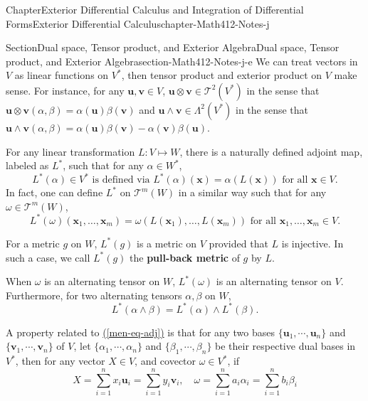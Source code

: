 \documentclass[oneside,10pt,]{book}
\newcommand{\xreffont}{\relax}
\newcommand{\terminology}[1]{\textbf{#1}}
\numberwithin{equation}{section}
\newcommand{\bu}{\mathbf{u}}
\newcommand{\bv}{\mathbf{v}}
\begin{document}
\begin{chapterptx}{Chapter}{Exterior Differential Calculus and Integration of Differential Forms}{}{Exterior Differential Calculus}{}{}{chapter-Math412-Notes-j}
\begin{sectionptx}{Section}{Dual space, Tensor product, and Exterior Algebra}{}{Dual space, Tensor product, and Exterior Algebra}{}{}{section-Math412-Notes-j-e}
We can treat vectors in \(V\) as linear functions on \(V^{*}\), then tensor product and exterior product  on \(V\) make sense. For instance, for any \(\bu, \bv \in V\), \(\bu\otimes \bv \in {\mathcal T}^{2}(V^{*})\) in the sense that \(\bu\otimes \bv (\alpha, \beta)= \alpha (\bu) \beta (\bv)\) and \(\bu\wedge\bv \in {\Lambda}^{2}(V^{*})\) in the sense that \(\bu\wedge \bv (\alpha, \beta)= \alpha (\bu) \beta (\bv)-\alpha(\bv)\beta (\bu)\).%
\par
For any linear transformation \(L:V\mapsto W\), there is a naturally defined adjoint map, labeled as \(L^{*}\), such that for any \(\alpha \in W^{*}\),%
\begin{equation}
L^{*}(\alpha)\in V^{*} \text{ is defined via }  L^{*}(\alpha)({\mathbf x})=\alpha(L({\mathbf x})) \text{ for all }
{\mathbf x} \in V.\label{men-eq-adj}
\end{equation}
In fact, one can define \(L^{*}\) on \({\mathcal T}^{m}(W)\) in a similar way such that for any \(\omega\in {\mathcal T}^{m}(W)\),%
\begin{equation*}
L^{*}(\omega)({\mathbf x}_{1}, \ldots, {\mathbf x}_{m})
=\omega(L({\mathbf x}_{1}), \ldots, L({\mathbf x}_{m})) \text{ for all }
{\mathbf x}_{1}, \ldots, {\mathbf x}_{m} \in V.
\end{equation*}
%
\par
For a metric \(g\) on \(W\), \(L^{*}(g)\) is a metric on \(V\) provided that \(L\) is injective. In such a case, we call \(L^{*}(g)\) the \terminology{pull-back metric} of \(g\) by \(L\).%
\par
When \(\omega\) is an alternating tensor on \(W\), \(L^{*}(\omega)\) is an alternating tensor on \(V\). Furthermore, for two alternating tensors \(\alpha, \beta\) on \(W\),%
\begin{equation*}
L^{*}(\alpha\wedge \beta)= L^{*}(\alpha)\wedge L^{*}(\beta).
\end{equation*}
%
\par
A property related to \hyperref[men-eq-adj]{({\xreffont\ref{men-eq-adj}})} is that for any two bases \(\{\bu_{1},\cdots, \bu_{n}\}\) and \(\{\bv_{1},\cdots, \bv_{n}\}\) of \(V\), let \(\{\alpha_{1},\cdots, \alpha_{n}\}\) and \(\{\beta_{1}, \cdots, \beta_{n}\}\) be their respective dual bases in \(V^{*}\), then for any vector \(X\in V\), and covector \(\omega \in V^{*}\), if%
\begin{equation*}
X=\sum_{i=1}^{n}x_{i} \bu_{i}=\sum_{i=1}^{n}y_{i}\bv_{i}, \quad
\omega=\sum_{i=1}^{n} a_{i} \alpha_{i}=\sum_{i=1}^{n} b_{i}\beta_{i}
\end{equation*}

\end{sectionptx}
\end{chapterptx}
\end{document}
